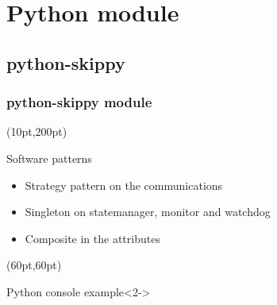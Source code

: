 \documentclass{beamer}
\begin{document}
\section{Python module}

\subsection{python-skippy}

\begin{frame}
  \frametitle{python-skippy module}
  \begin{textblock*}{160pt}(10pt,200pt)
    \begin{block}{{\tiny Software patterns}}
      \begin{itemize}%
        \setlength{\itemsep}{-7pt}
        \setlength{\parskip}{0pt}
        \setlength{\parsep}{-5pt}
        \item[] {\tiny Strategy pattern on the communications} \\
        \item[] {\tiny Singleton on statemanager, monitor and watchdog} \\
        \item[] {\tiny Composite in the attributes}
      \end{itemize}
    \end{block}
  \end{textblock*}
  \begin{textblock*}{260pt}(60pt,60pt)
    \begin{exampleblock}{Python console example}<2->
      
    \end{exampleblock}
  \end{textblock*}
\end{frame}
\end{document}
